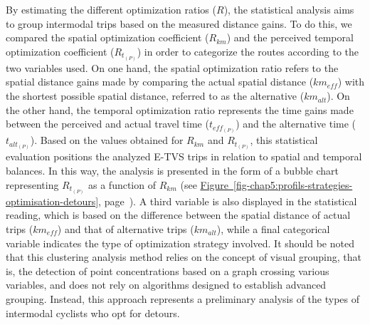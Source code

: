 \begin{refsegment}
By estimating the different optimization ratios (\(R\)), the statistical analysis aims to group intermodal trips based on the measured distance gains. To do this, we compared the spatial optimization coefficient (\(R_{km}\)) and the perceived temporal optimization coefficient (\(R_{t_{(P)}}\)) in order to categorize the routes according to the two variables used. On one hand, the spatial optimization ratio refers to the spatial distance gains made by comparing the actual spatial distance (\(km_{eff}\)) with the shortest possible spatial distance, referred to as the alternative (\(km_{alt}\)). On the other hand, the temporal optimization ratio represents the time gains made between the perceived and actual travel time (\(t_{eff_{(P)}}\)) and the alternative time (\(t_{alt_{(P)}}\)). Based on the values obtained for \(R_{km}\) and \(R_{t_{(P)}}\), this statistical evaluation positions the analyzed \acrshort{E-TVS} trips in relation to spatial and temporal balances. In this way, the analysis is presented in the form of a bubble chart representing \(R_{t_{(P)}}\) as a function of \(R_{km}\) (see \hyperref[fig-chap5:profils-strategies-optimisation-detours]{Figure~\ref{fig-chap5:profils-strategies-optimisation-detours}}, page~\pageref{fig-chap5:profils-strategies-optimisation-detours}). A third variable is also displayed in the statistical reading, which is based on the difference between the spatial distance of actual trips (\(km_{eff}\)) and that of alternative trips (\(km_{alt}\)), while a final categorical variable indicates the type of optimization strategy involved. It should be noted that this clustering analysis method relies on the concept of visual grouping, that is, the detection of point concentrations based on a graph crossing various variables, and does not rely on algorithms designed to establish advanced grouping. Instead, this approach represents a preliminary analysis of the types of intermodal cyclists who opt for detours.%


\end{refsegment}
